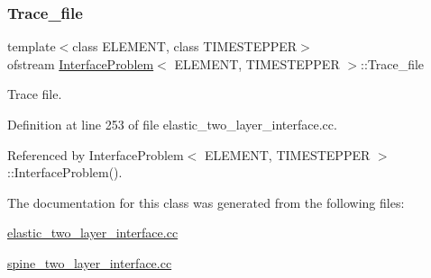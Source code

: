 \subsubsection{\texorpdfstring{Trace\+\_\+file}{Trace\_file}}
{\footnotesize\ttfamily template$<$class E\+L\+E\+M\+E\+NT, class T\+I\+M\+E\+S\+T\+E\+P\+P\+ER$>$ \\
ofstream \hyperlink{classInterfaceProblem}{Interface\+Problem}$<$ E\+L\+E\+M\+E\+NT, T\+I\+M\+E\+S\+T\+E\+P\+P\+ER $>$\+::Trace\+\_\+file\hspace{0.3cm}{\ttfamily [private]}}



Trace file. 



Definition at line 253 of file elastic\+\_\+two\+\_\+layer\+\_\+interface.\+cc.



Referenced by Interface\+Problem$<$ E\+L\+E\+M\+E\+N\+T, T\+I\+M\+E\+S\+T\+E\+P\+P\+E\+R $>$\+::\+Interface\+Problem().



The documentation for this class was generated from the following files\+:\begin{DoxyCompactItemize}
\item 
\hyperlink{elastic__two__layer__interface_8cc}{elastic\+\_\+two\+\_\+layer\+\_\+interface.\+cc}\item 
\hyperlink{spine__two__layer__interface_8cc}{spine\+\_\+two\+\_\+layer\+\_\+interface.\+cc}\end{DoxyCompactItemize}
